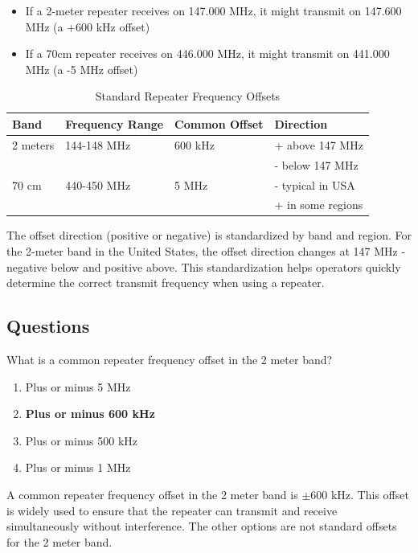 \begin{itemize}
    \item If a 2-meter repeater receives on 147.000 MHz, it might transmit on 147.600 MHz (a +600 kHz offset)
    \item If a 70cm repeater receives on 446.000 MHz, it might transmit on 441.000 MHz (a -5 MHz offset)
\end{itemize}

\begin{table}[h!]
    \centering
    \begin{tabular}{|l|l|l|l|}
        \hline
        \textbf{Band} & \textbf{Frequency Range} & \textbf{Common Offset} & \textbf{Direction} \\
        \hline
        2 meters & 144-148 MHz & 600 kHz & + above 147 MHz \\
        & & & - below 147 MHz \\
        \hline
        70 cm & 440-450 MHz & 5 MHz & - typical in USA \\
        & & & + in some regions \\
        \hline
    \end{tabular}
    \caption{Standard Repeater Frequency Offsets}
    \label{tab:repeater_offsets}
\end{table}

The offset direction (positive or negative) is standardized by band and region. For the 2-meter band in the United States, the offset direction changes at 147 MHz - negative below and positive above. This standardization helps operators quickly determine the correct transmit frequency when using a repeater.

\subsection*{Questions}

\begin{tcolorbox}[colback=gray!10!white,colframe=black!75!black,title={T2A01}]
What is a common repeater frequency offset in the 2 meter band?
\begin{enumerate}[label=\Alph*),noitemsep]
    \item Plus or minus 5 MHz
    \item \textbf{Plus or minus 600 kHz}
    \item Plus or minus 500 kHz
    \item Plus or minus 1 MHz
\end{enumerate}
\end{tcolorbox}
A common repeater frequency offset in the 2 meter band is $\pm 600$ kHz. This offset is widely used to ensure that the repeater can transmit and receive simultaneously without interference. The other options are not standard offsets for the 2 meter band.

